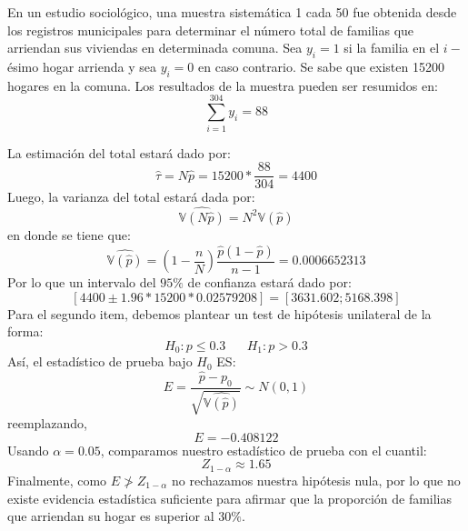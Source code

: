\addpoints
\question[25] En un estudio sociológico, una muestra sistemática 1 cada 50 fue obtenida desde los registros municipales para determinar el número total de familias que arriendan sus viviendas en determinada comuna. Sea $y_i=1$ si la familia en el $i-$ésimo hogar arrienda y sea $y_i=0$ en caso contrario. Se sabe que existen 15200 hogares en la comuna. Los resultados de la muestra pueden ser resumidos en:
$$\sum_{i=1}^{304} y_i=88$$
\noaddpoints
{}
\begin{solution}
La estimación del total estará dado por:
$$\hat{\tau}=N\hat{p}=15200*\dfrac{88}{304}=4400$$
Luego, la varianza del total estará dada por:
$$\widehat{\mathbb{V}(N\widehat{p})}=N^2\mathbb{V}(\widehat{p})$$
en donde se tiene que:
$$\widehat{\mathbb{V}(\widehat{p})}=\left(1-\dfrac{n}{N}\right)\dfrac{\widehat{p}(1-\widehat{p})}{n-1}=0.0006652313$$
Por lo que un intervalo del $95\%$ de confianza estará dado por:
$$[4400 \pm 1.96 * 15200 * 0.02579208]=[3631.602;5168.398]$$ 
Para el segundo item, debemos plantear un test de hipótesis unilateral de la forma:
$$H_0: p \leq 0.3 \hspace{20pt} H_1: p> 0.3$$
Así, el estadístico de prueba bajo $H_0$ ES:
$$E=\dfrac{\widehat{p}-p_0}{\sqrt{\widehat{\mathbb{V}(\widehat{p})}}}\sim N(0,1)$$
reemplazando,
$$E=-0.408122$$
Usando $\alpha=0.05$, comparamos nuestro estadístico de prueba con el cuantil:
$$Z_{1-\alpha}\approx 1.65$$
Finalmente, como $E \ngtr Z_{1-\alpha}$ no rechazamos nuestra hipótesis nula, por lo que no existe evidencia estadística suficiente para afirmar que la proporción de familias que arriendan su hogar es superior al $30\%$.
\end{solution}